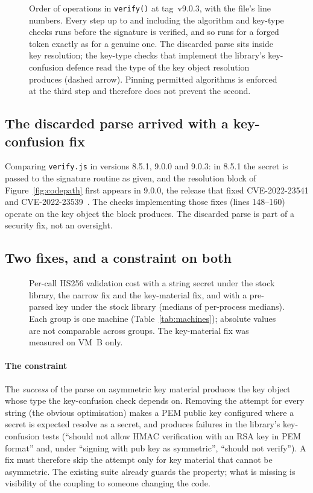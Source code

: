 \documentclass[preprint,12pt,authoryear]{elsarticle}
\newcommand{\LibraryTag}{tag~v9.0.3}
\newcommand{\NaiveFailingTests}{``should not allow HMAC verification with an RSA
key in PEM format'' and, under ``signing with pub key as symmetric'', ``should
not verify''}
\begin{document}
\begin{figure}[!t]
\centering

\caption{Order of operations in \texttt{verify()} at \LibraryTag, with the
file's line numbers. Every step up to and including the algorithm and key-type
checks runs before the signature is verified, and so runs for a forged token
exactly as for a genuine one. The discarded parse sits inside key
resolution; the key-type checks that implement the library's key-confusion
defence read the type of the key object resolution produces (dashed arrow).
Pinning permitted algorithms is enforced at the third step and therefore does
not prevent the second.}
\label{fig:verifyorder}
\end{figure}

\subsection{The discarded parse arrived with a key-confusion fix}\label{sec:provenance}

Comparing \texttt{verify.js} in versions 8.5.1, 9.0.0 and 9.0.3: in 8.5.1 the
secret is passed to the signature routine as given, and the resolution block of
Figure~\ref{fig:codepath} first appears in 9.0.0, the release that fixed
CVE-2022-23541 and CVE-2022-23539~\citep{auth0bulletin2022}. The checks
implementing those fixes (lines 148--160) operate on the key object the block
produces. The discarded parse is part of a security fix, not an oversight.

\subsection{Two fixes, and a constraint on both}\label{sec:fix}

\begin{figure}[!t]
\centering

\caption{Per-call HS256 validation cost with a string secret under the stock
library, the narrow fix and the key-material fix, and with a pre-parsed key
under the stock library (medians of per-process medians). Each group is one
machine (Table~\ref{tab:machines}); absolute values are not comparable across
groups. The key-material fix was measured on VM~B only.}
\label{fig:remedies}
\end{figure}

\paragraph{The constraint} The \emph{success} of the parse on asymmetric key
material produces the key object whose type the key-confusion check depends
on. Removing the attempt for every string (the obvious optimisation) makes a
PEM public key configured where a secret is expected resolve as a secret, and
produces \SuiteNaiveFailing{} failures in the library's key-confusion tests
(\NaiveFailingTests). A fix must therefore skip the attempt only for key
material that cannot be asymmetric. The existing suite already guards the
property; what is missing is visibility of the coupling to someone changing
the code.
\end{document}
